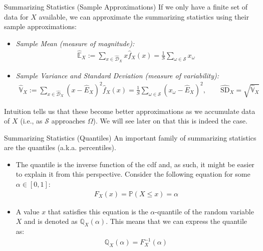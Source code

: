 \documentclass[9pt]{beamer}
\begin{document}
%
\begin{frame}{Summarizing Statistics (Sample Approximations)}
If we only have a finite set of data for $X$ available, we can approximate the summarizing statistics using their sample approximations: 
\begin{block}{}
\begin{itemize}
\item {\em Sample Mean (measure of magnitude):} 
\begin{align*}
\hat{\mathbb{E}}_X:=\sum_{x\in \hat{\mathcal{D}}_X}x\hat{f}_X(x)=\frac{1}{S}\sum_{\omega\in \mathcal{S}}x_\omega
\end{align*}
\item {\em Sample Variance and Standard Deviation (measure of variability):} 
\begin{align*}
\hat{\mathbb{V}}_X:=\sum_{x\in \hat{\mathcal{D}}_X}(x-\hat{E}_X)^2\hat{f}_X(x)=\frac{1}{S}\sum_{\omega\in \mathcal{S}}(x_\omega-\hat{E}_X)^2,\qquad \hat{\textrm{SD}}_X=\sqrt{\hat{\mathbb{V}}_X}
\end{align*}
\end{itemize}
\end{block}
Intuition tells us that these become better approximations as we accumulate data of $X$ (i.e., as $\mathcal{S}$ approaches $\Omega$). We will see later on that this is indeed the case. 
\end{frame}

%
\begin{frame}{Summarizing Statistics (Quantiles)}
An important family of summarizing statistics are the quantiles (a.k.a. percentiles). 
\begin{block}{}
\begin{itemize}
\item The quantile is the inverse function of the cdf and, as such, it might be easier to explain it from this perspective.  Consider the following equation for some $\alpha \in [0,1]$:
\begin{align*}
F_X(x)=\mathbb{P}(X\leq x)=\alpha 
\end{align*}
\item A value $x$ that satisfies this equation is the $\alpha$-quantile of the random variable $X$ and is denoted as $\mathbb{Q}_X(\alpha)$. This means that we can express the quantile as:
\begin{align*}
\mathbb{Q}_X(\alpha)=F^{-1}_X(\alpha) 
\end{align*}
\end{itemize}
\end{block}
\end{frame}
\end{document}
